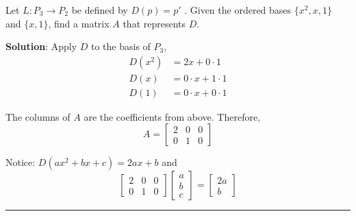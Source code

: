 \begin{example}
Let $L:P_3 \to P_2$ be defined by $D(p) = p'$ .  Given the ordered bases $\{ x^2, x, 1 \}$ and $ \{ x, 1 \}$, find a matrix $A$ that represents $D$.  

\textbf{Solution}:  Apply $D$ to the basis of $P_3$, 
\begin{align*}
	D(x^2) &= 2x + 0 \cdot 1\\
	D(x) &= 0 \cdot x + 1 \cdot 1\\
	D(1) &= 0 \cdot x + 0 \cdot 1
\end{align*}

The columns of $A$ are the coefficients from above.  Therefore, 
\[  A  = \begin{bmatrix}  2 & 0 & 0 \\ 0 & 1 & 0  \end{bmatrix} \]

Notice: $D(ax^2 + bx + c) = 2ax + b$ and 
\[  \begin{bmatrix}  2 & 0 & 0 \\ 0 & 1 & 0  \end{bmatrix}  \begin{bmatrix} a  \\  b  \\ c  \end{bmatrix} =   \begin{bmatrix}  2a \\ b \end{bmatrix}  \]

\end{example}









\rule[0.01in]{\textwidth}{0.0025in}









